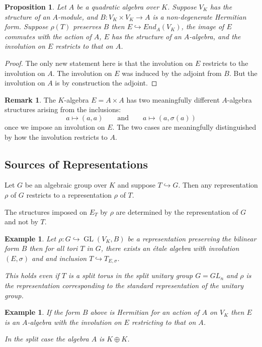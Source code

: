 \documentclass{article}
\theoremstyle{plain}
\newtheorem{proposition}[theorem]{Proposition}
\newtheorem{example}[theorem]{Example}
\theoremstyle{definition}
\newtheorem{remark}[theorem]{Remark}
\DeclareMathOperator{\GL}{GL}
\begin{document}
\begin{proposition}
Let $A$ be a quadratic algebra over $K$. Suppose $V_K$ has the structure of an $A$-module, and $B : V_K \times V_K \rightarrow A$ is a non-degenerate Hermitian form.
Suppose  $\rho(T)$ preserves $B$ then $E\hookrightarrow End_A(V_K)$, the image of $E$ commutes with the action of $A$,  $E$ has the structure of an $A$-algebra, and the involution on $E$ restricts to that on $A$.
\end{proposition}
\begin{proof}
The only new statement here is that the involution on $E$ restricts to the involution on $A$.
The involution on $E$ was induced by the adjoint from $B$. But the involution on $A$ is by construction the adjoint.
\end{proof}
\begin{remark}
The $K$-algebra $E= A\times A$ has two meaningfully different $A$-algebra structures arising from the inclusions:
\[ a \mapsto (a,a) \qquad \text{and}\qquad a\mapsto (a,\sigma(a)) \]
once we impose an involution on $E$. The two cases are meaningfully distinguished by how the involution restricts to $A$.
\end{remark}


\subsection{Sources of Representations}

Let $G$ be an algebraic group over $K$ and suppose $T \hookrightarrow G$.
Then any representation $\rho$ of $G$ restricts to a representation $\rho$ of $T$.

The structures imposed on $E_T$ by $\rho$ are determined by the representation of $G$ and not by $T$.

\begin{example}
Let $\rho:G \hookrightarrow \GL(V_K,B)$ be a representation preserving the bilinear form $B$ then for all tori $T$ in $G$, there exists an \'etale algebra with involution $(E,\sigma)$ and and inclusion $T \hookrightarrow T_{E,\sigma}$.

This holds even if $T$ is a split torus in the split unitary group $G=GL_n$ and $\rho$ is the representation corresponding to the standard representation of the unitary group.
\end{example}

\begin{example}
If the form $B$ above is Hermitian for an action of $A$ on $V_K$ then $E$ is an $A$-algebra with the involution on $E$ restricting to that on $A$.

In the split case the algebra $A$ is $K\oplus K$.
\end{example}
\end{document}
